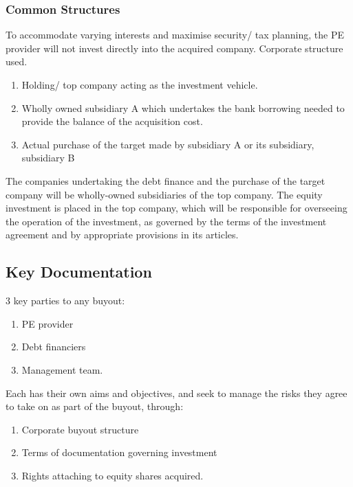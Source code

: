 \documentclass[
]{article}
\providecommand{\tightlist}{%
  \setlength{\itemsep}{0pt}\setlength{\parskip}{0pt}}
\begin{document}
\hypertarget{common-structures}{%
\subsubsection{Common Structures}\label{common-structures}}

To accommodate varying interests and maximise security/ tax planning,
the PE provider will not invest directly into the acquired company.
Corporate structure used.

\begin{enumerate}
\tightlist
\item
  Holding/ top company acting as the investment vehicle.
\item
  Wholly owned subsidiary A which undertakes the bank borrowing needed
  to provide the balance of the acquisition cost.
\item
  Actual purchase of the target made by subsidiary A or its subsidiary,
  subsidiary B
\end{enumerate}

The companies undertaking the debt finance and the purchase of the
target company will be wholly-owned subsidiaries of the top company. The
equity investment is placed in the top company, which will be
responsible for overseeing the operation of the investment, as governed
by the terms of the investment agreement and by appropriate provisions
in its articles.

\hypertarget{key-documentation}{%
\subsection{Key Documentation}\label{key-documentation}}

3 key parties to any buyout:

\begin{enumerate}
\tightlist
\item
  PE provider
\item
  Debt financiers
\item
  Management team.
\end{enumerate}

Each has their own aims and objectives, and seek to manage the risks
they agree to take on as part of the buyout, through:

\begin{enumerate}
\tightlist
\item
  Corporate buyout structure
\item
  Terms of documentation governing investment
\item
  Rights attaching to equity shares acquired.
\end{enumerate}
\end{document}
